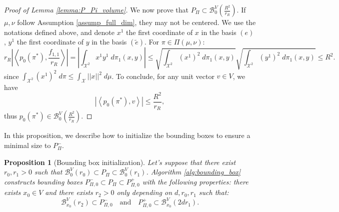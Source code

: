 \documentclass{article}
\newcommand{\X}{\mathcal{X}}
\newcommand{\1}{\mathbf{1}}
\newtheorem{proposition}{Proposition}
\theoremstyle{definition}
\theoremstyle{remark}
\begin{document}
\begin{appendices}
\begin{proof}[Proof of Lemma \ref{lemma:P_Pi_volume}]
    We now prove that $P_\Pi\subset\mathcal{B}^V_{0}(\frac{R^2}{r_R})$. If $\mu,\nu$ follow Assumption \ref{assump_full_dim}, they may not be centered.  We use the notations defined above, and denote $x^1$ the first coordinate of $x$ in the basis $(e)$, $y^1$ the first coordinate of $y$ in the basis $(\tilde{e})$. For $\pi\in \Pi(\mu,\nu)$: \[r_R\left|\left\langle p_0(\pi^*), \frac{f_{1,1}}{r_R}\right\rangle\right|=\left|\int_{\X^2}  x^1y^1\;d\pi_1(x,y)\right|\leq\sqrt{\int_{\X^2}  (x^1)^2\;d\pi_1(x,y)}\sqrt{\int_{\X^2}  (y^1)^2\;d\pi_1(x,y)} \leq R^2.\]
    since $\int_{\X^2}  (x^1)^2\;d\pi \leq \int_{\X}  ||x||^2\;d\mu$. To conclude, for any unit vector $v\in V$, we have \[\left|\left\langle p_0(\pi^*), v\right\rangle\right|\leq \frac{R^2}{r_R},\]
    thus $ p_0(\pi^*)\in\mathcal{B}^V_{0}(\frac{R^2}{r_R})$.
\end{proof}
In this proposition, we describe how to initialize the bounding boxes to ensure a minimal size to $P_\Pi^{-}$.


\begin{proposition}[Bounding box initialization]\label{prop:bounding_box}
    Let's suppose that there exist $r_0,r_1>0$ such that $\mathcal{B}^V_{0}(r_0)\subset P_\Pi\subset\mathcal{B}^V_{0}(r_1)$. Algorithm \ref{alg:bounding_box}  constructs bounding boxes $P_{\Pi,0}^-\subset P_\Pi\subset P_{\Pi,0}^+$ with the following properties: there exists $x_0\in V$ and there exists $r_2>0$ only depending on $d,r_0,r_1$ such that: \[\mathcal{B}^V_{x_0}(r_2)\subset P_{\Pi,0}^-\quad\mathrm{and}\quad P_{\Pi,0}^+\subset\mathcal{B}^V_{x_0}(2dr_1).\]
\end{proposition}



\end{appendices}
\end{document}
